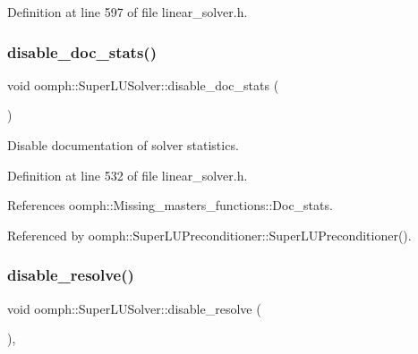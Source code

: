 Definition at line 597 of file linear\+\_\+solver.\+h.

\mbox{\label{classoomph_1_1SuperLUSolver_ad4a6f466585f86cbba0b033eb8cda0e4}} 
\subsubsection{\texorpdfstring{disable\+\_\+doc\+\_\+stats()}{disable\_doc\_stats()}}
{\footnotesize\ttfamily void oomph\+::\+Super\+L\+U\+Solver\+::disable\+\_\+doc\+\_\+stats (\begin{DoxyParamCaption}{ }\end{DoxyParamCaption})\hspace{0.3cm}{\ttfamily [inline]}}



Disable documentation of solver statistics. 



Definition at line 532 of file linear\+\_\+solver.\+h.



References oomph\+::\+Missing\+\_\+masters\+\_\+functions\+::\+Doc\+\_\+stats.



Referenced by oomph\+::\+Super\+L\+U\+Preconditioner\+::\+Super\+L\+U\+Preconditioner().

\mbox{\label{classoomph_1_1SuperLUSolver_ac278643faf0a13eb3f8e6bc984338d2a}} 
\subsubsection{\texorpdfstring{disable\+\_\+resolve()}{disable\_resolve()}}
{\footnotesize\ttfamily void oomph\+::\+Super\+L\+U\+Solver\+::disable\+\_\+resolve (\begin{DoxyParamCaption}{ }\end{DoxyParamCaption})\hspace{0.3cm}{\ttfamily [inline]}, {\ttfamily [virtual]}}



